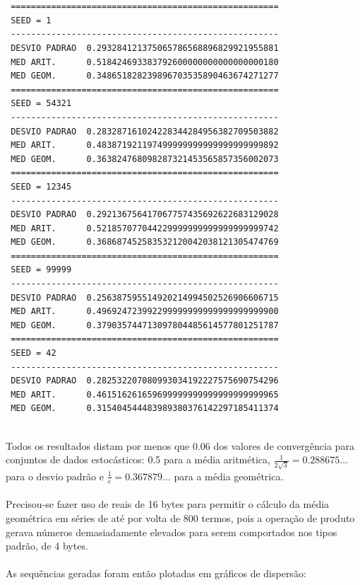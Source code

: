 \message{ !name(relatorio.tex)}\documentclass{article}
\begin{document}
\begin{lstlisting}


 =====================================================
 SEED = 1
 -----------------------------------------------------
 DESVIO PADRAO  0.293284121375065786568896829921955881      
 MED ARIT.      0.518424693383792600000000000000000180      
 MED GEOM.      0.348651828239896703535890463674271277      
 =====================================================
 SEED = 54321
 -----------------------------------------------------
 DESVIO PADRAO  0.283287161024228344284956382709503882      
 MED ARIT.      0.483871921197499999999999999999999892      
 MED GEOM.      0.363824768098287321453565857356002073      
 =====================================================
 SEED = 12345
 -----------------------------------------------------
 DESVIO PADRAO  0.292136756417067757435692622683129028      
 MED ARIT.      0.521857077044229999999999999999999742      
 MED GEOM.      0.368687452583532120042038121305474769      
 =====================================================
 SEED = 99999
 -----------------------------------------------------
 DESVIO PADRAO  0.256387595514920214994502526906606715      
 MED ARIT.      0.496924723992299999999999999999999900      
 MED GEOM.      0.379035744713097804485614577801251787      
 =====================================================
 SEED = 42
 -----------------------------------------------------
 DESVIO PADRAO  0.282532207080993034192227575690754296      
 MED ARIT.      0.461516261659699999999999999999999965      
 MED GEOM.      0.315404544483989380376142297185411374 


\end{lstlisting}
Todos os resultados distam por menos que 0.06 dos valores de convergência para conjuntos de dados estocásticos: 0.5 para a média aritmética, \(\frac{1}{2\sqrt{3}} = 0.288675...\) para o desvio padrão e \(\frac{1}{e}=0.367879...\) para a média geométrica.\paragraph{}
Precisou-se fazer uso de reais de 16 bytes para permitir o cálculo da média geométrica em séries de até por volta de 800 termos, pois a operação de produto gerava números demasiadamente elevados para serem comportados nos tipos padrão, de 4 bytes.\paragraph{}
As sequências geradas foram então plotadas em gráficos de dispersão:
\end{document}
